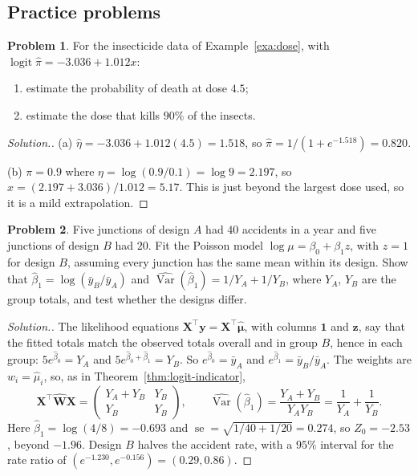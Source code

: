 \documentclass[11pt,a4paper]{article}
\numberwithin{equation}{section}
\theoremstyle{definition}
\newtheorem{problemx}{Problem}[subsection]
\newenvironment{problem}{\begin{problemx}}{\end{problemx}}
\newenvironment{solution}
  {\renewcommand{\qedsymbol}{}\begin{proof}[\textit{Solution}.]}
  {\end{proof}}
\begin{document}
\subsection{Practice problems}
\begin{problem}\label{prob:ed90}
For the insecticide data of Example~\ref{exa:dose}, with $\operatorname{logit}\hat\pi = -3.036 + 1.012x$:
\begin{enumerate}[label=(\alph*)]
\item estimate the probability of death at dose $4.5$;
\item estimate the dose that kills $90\%$ of the insects.
\end{enumerate}
\end{problem}

\begin{solution}
(a) $\hat\eta = -3.036 + 1.012(4.5) = 1.518$, so $\hat\pi = 1/(1 + e^{-1.518}) = 0.820$.

(b) $\pi = 0.9$ where $\eta = \log(0.9/0.1) = \log 9 = 2.197$, so $x = (2.197 + 3.036)/1.012 = 5.17$. This is just beyond the largest dose
used, so it is a mild extrapolation.
\end{solution}

\begin{problem}\label{prob:poisson-indicator}
Five junctions of design $A$ had $40$ accidents in a year and five junctions of design $B$ had $20$. Fit the Poisson model
$\log\mu = \beta_0 + \beta_1z$, with $z = 1$ for design $B$, assuming every junction has the same mean within its design. Show
that $\hat\beta_1 = \log(\bar y_B/\bar y_A)$ and $\widehat{\operatorname{Var}}(\hat\beta_1) = 1/Y_A + 1/Y_B$, where $Y_A$, $Y_B$ are the group totals, and test
whether the designs differ.
\end{problem}

\begin{solution}
The likelihood equations $\mathbf{X}^\top\mathbf{y} = \mathbf{X}^\top\hat{\boldsymbol\mu}$, with columns $\mathbf{1}$ and $\mathbf{z}$, say that the fitted totals match the
observed totals overall and in group $B$, hence in each group: $5e^{\hat\beta_0} = Y_A$ and $5e^{\hat\beta_0 + \hat\beta_1} = Y_B$. So
$e^{\hat\beta_0} = \bar y_A$ and $e^{\hat\beta_1} = \bar y_B/\bar y_A$. The weights are $w_i = \hat\mu_i$, so, as in Theorem~\ref{thm:logit-indicator},
\[
\mathbf{X}^\top\hat{\mathbf{W}}\mathbf{X} = \begin{pmatrix} Y_A + Y_B & Y_B \\ Y_B & Y_B \end{pmatrix} ,
\qquad \widehat{\operatorname{Var}}(\hat\beta_1) = \frac{Y_A + Y_B}{Y_AY_B} = \frac{1}{Y_A} + \frac{1}{Y_B} .
\]
Here $\hat\beta_1 = \log(4/8) = -0.693$ and $\operatorname{se} = \sqrt{1/40 + 1/20} = 0.274$, so $Z_0 = -2.53$, beyond $-1.96$. Design $B$ halves the
accident rate, with a $95\%$ interval for the rate ratio of $(e^{-1.230}, e^{-0.156}) = (0.29, 0.86)$.
\end{solution}
\end{document}
